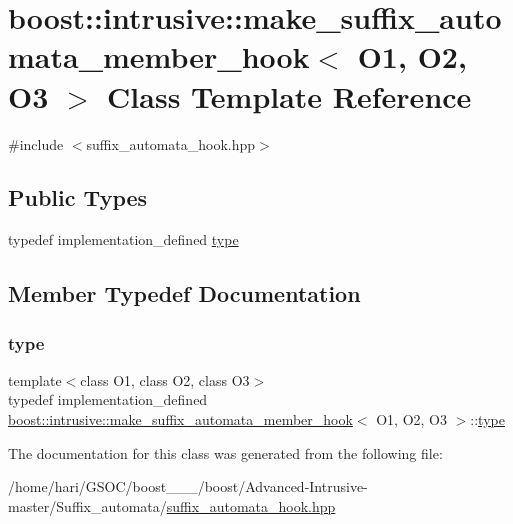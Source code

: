 \hypertarget{classboost_1_1intrusive_1_1make__suffix__automata__member__hook}{}\section{boost\+:\+:intrusive\+:\+:make\+\_\+suffix\+\_\+automata\+\_\+member\+\_\+hook$<$ O1, O2, O3 $>$ Class Template Reference}
\label{classboost_1_1intrusive_1_1make__suffix__automata__member__hook}


{\ttfamily \#include $<$suffix\+\_\+automata\+\_\+hook.\+hpp$>$}

\subsection*{Public Types}
\begin{DoxyCompactItemize}
\item 
typedef implementation\+\_\+defined \hyperlink{classboost_1_1intrusive_1_1make__suffix__automata__member__hook_a01166563956b1d994be6c34cba43efc1}{type}
\end{DoxyCompactItemize}


\subsection{Member Typedef Documentation}
\mbox{\label{classboost_1_1intrusive_1_1make__suffix__automata__member__hook_a01166563956b1d994be6c34cba43efc1}} 
\subsubsection{\texorpdfstring{type}{type}}
{\footnotesize\ttfamily template$<$class O1, class O2, class O3$>$ \\
typedef implementation\+\_\+defined \hyperlink{classboost_1_1intrusive_1_1make__suffix__automata__member__hook}{boost\+::intrusive\+::make\+\_\+suffix\+\_\+automata\+\_\+member\+\_\+hook}$<$ O1, O2, O3 $>$\+::\hyperlink{classboost_1_1intrusive_1_1make__suffix__automata__member__hook_a01166563956b1d994be6c34cba43efc1}{type}}



The documentation for this class was generated from the following file\+:\begin{DoxyCompactItemize}
\item 
/home/hari/\+G\+S\+O\+C/boost\+\_\+\_\+\_/boost/\+Advanced-\/\+Intrusive-\/master/\+Suffix\+\_\+automata/\hyperlink{suffix__automata__hook_8hpp}{suffix\+\_\+automata\+\_\+hook.\+hpp}\end{DoxyCompactItemize}
